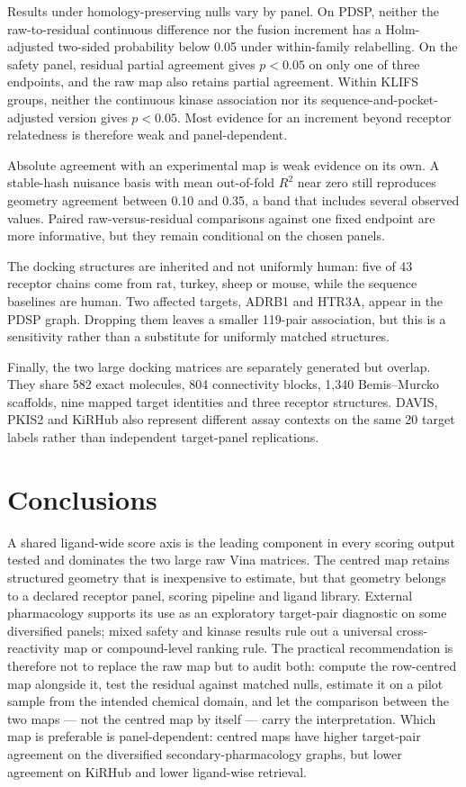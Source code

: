 Results under homology-preserving nulls vary by panel. On PDSP, neither the raw-to-residual
continuous difference nor the fusion increment has a Holm-adjusted two-sided probability below
0.05 under within-family relabelling. On the safety panel, residual partial agreement gives
$p<0.05$ on only one of three endpoints, and the
raw map also retains partial agreement. Within KLIFS groups, neither the continuous kinase
association nor its sequence-and-pocket-adjusted version gives $p<0.05$. Most evidence for an increment beyond receptor
relatedness is therefore weak and panel-dependent.

Absolute agreement with an experimental map is weak evidence on its own. A stable-hash nuisance
basis with mean out-of-fold $R^2$ near zero still reproduces geometry agreement between 0.10 and
0.35, a band that includes several observed values. Paired raw-versus-residual comparisons against
one fixed endpoint are more informative, but they remain conditional on the chosen panels.

The docking structures are inherited and not uniformly human: five of 43 receptor chains come from
rat, turkey, sheep or mouse, while the sequence baselines are human. Two affected targets, ADRB1 and
HTR3A, appear in the PDSP graph. Dropping them leaves a smaller 119-pair association, but this is a
sensitivity rather than a substitute for uniformly matched structures.

Finally, the two large docking matrices are separately generated but overlap. They share 582 exact
molecules, 804 connectivity blocks, 1{,}340 Bemis--Murcko scaffolds, nine mapped target identities and
three receptor structures. DAVIS, PKIS2 and KiRHub also represent different assay contexts on the
same 20 target labels rather than independent target-panel replications.

\section{Conclusions}

A shared ligand-wide score axis is the leading component in every scoring output tested and dominates
the two large raw Vina matrices. The centred map retains structured geometry that is inexpensive to
estimate, but that geometry belongs to a declared receptor panel, scoring pipeline and ligand library. External
pharmacology supports its use as an exploratory target-pair diagnostic on some diversified panels;
mixed safety and kinase results rule out a universal cross-reactivity map or compound-level ranking
rule. The practical recommendation is therefore not to replace the raw map but to audit both:
compute the row-centred map alongside it, test the residual against matched nulls, estimate it
on a pilot sample from the intended chemical domain, and let the comparison between the two
maps --- not the centred map by itself --- carry the interpretation. Which map is preferable is
panel-dependent: centred maps have higher target-pair agreement on the diversified
secondary-pharmacology graphs, but lower agreement on KiRHub and lower ligand-wise retrieval.
